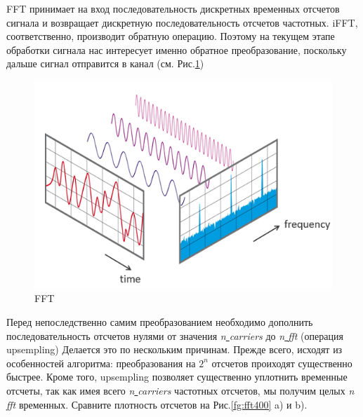 FFT принимает на вход последовательность дискретных временных отсчетов сигнала и возвращает дискретную последовательность отсчетов частотных. iFFT,  соответственно, производит обратную операцию. 
Поэтому на текущем этапе обработки сигнала нас интересует именно обратное преобразование, поскольку дальше сигнал отправится в канал
(см. Рис.\ref{fg:fft})


\begin{figure}[!h]
\centering
\includegraphics[]{FFT.png}
\caption{FFT} \label{fg:fft}
\end{figure}

Перед непоследственно самим преобразованием необходимо дополнить последовательность отсчетов нулями от значения \textit{n\underline{ }carriers} до \textit{n\underline{ }fft} (операция upsempling)
Делается это по нескольким причинам.
Прежде всего, исходят из особенностей алгоритма: преобразования на $2^n$ отсчетов проиходят существенно быстрее. 
Кроме того, upsempling позволяет существенно уплотнить временные отсчеты, так как имея всего \textit{n\underline{ }carriers} частотных отсчетов, мы получим целых \textit{n\underline{ }fft} временных. 
Сравните плотность отсчетов на Рис.\ref{fg:fft400} a) и b).

